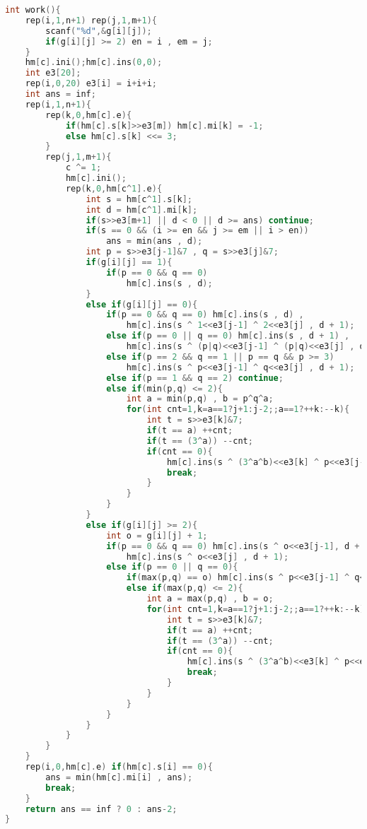 \begin{lstlisting}[language=C++]
int work(){
    rep(i,1,n+1) rep(j,1,m+1){
        scanf("%d",&g[i][j]);
        if(g[i][j] >= 2) en = i , em = j;
    }
    hm[c].ini();hm[c].ins(0,0);
    int e3[20];
    rep(i,0,20) e3[i] = i+i+i;
    int ans = inf;
    rep(i,1,n+1){
        rep(k,0,hm[c].e){
            if(hm[c].s[k]>>e3[m]) hm[c].mi[k] = -1;
            else hm[c].s[k] <<= 3;
        }
        rep(j,1,m+1){
            c ^= 1;
            hm[c].ini();
            rep(k,0,hm[c^1].e){
                int s = hm[c^1].s[k];
                int d = hm[c^1].mi[k];
                if(s>>e3[m+1] || d < 0 || d >= ans) continue;
                if(s == 0 && (i >= en && j >= em || i > en))
                    ans = min(ans , d);
                int p = s>>e3[j-1]&7 , q = s>>e3[j]&7;
                if(g[i][j] == 1){
                    if(p == 0 && q == 0)
                        hm[c].ins(s , d);
                }
                else if(g[i][j] == 0){
                    if(p == 0 && q == 0) hm[c].ins(s , d) ,
                        hm[c].ins(s ^ 1<<e3[j-1] ^ 2<<e3[j] , d + 1);
                    else if(p == 0 || q == 0) hm[c].ins(s , d + 1) ,
                        hm[c].ins(s ^ (p|q)<<e3[j-1] ^ (p|q)<<e3[j] , d + 1);
                    else if(p == 2 && q == 1 || p == q && p >= 3)
                        hm[c].ins(s ^ p<<e3[j-1] ^ q<<e3[j] , d + 1);
                    else if(p == 1 && q == 2) continue;
                    else if(min(p,q) <= 2){
                        int a = min(p,q) , b = p^q^a;
                        for(int cnt=1,k=a==1?j+1:j-2;;a==1?++k:--k){
                            int t = s>>e3[k]&7;
                            if(t == a) ++cnt;
                            if(t == (3^a)) --cnt;
                            if(cnt == 0){
                                hm[c].ins(s ^ (3^a^b)<<e3[k] ^ p<<e3[j-1] ^ q<<e3[j] , d + 1);
                                break;
                            }
                        }
                    }
                }
                else if(g[i][j] >= 2){
                    int o = g[i][j] + 1;
                    if(p == 0 && q == 0) hm[c].ins(s ^ o<<e3[j-1], d + 1) ,
                        hm[c].ins(s ^ o<<e3[j] , d + 1);
                    else if(p == 0 || q == 0){
                        if(max(p,q) == o) hm[c].ins(s ^ p<<e3[j-1] ^ q<<e3[j] , d + 1);
                        else if(max(p,q) <= 2){
                            int a = max(p,q) , b = o;
                            for(int cnt=1,k=a==1?j+1:j-2;;a==1?++k:--k){
                                int t = s>>e3[k]&7;
                                if(t == a) ++cnt;
                                if(t == (3^a)) --cnt;
                                if(cnt == 0){
                                    hm[c].ins(s ^ (3^a^b)<<e3[k] ^ p<<e3[j-1] ^ q<<e3[j] , d + 1);
                                    break;
                                }
                            }
                        }
                    }
                }
            }
        }
    }
    rep(i,0,hm[c].e) if(hm[c].s[i] == 0){
        ans = min(hm[c].mi[i] , ans);
        break;
    }
    return ans == inf ? 0 : ans-2;
}



\end{lstlisting}
